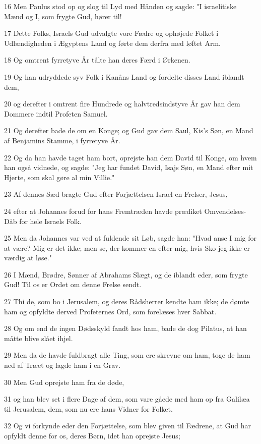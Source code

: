 \par 16 Men Paulus stod op og slog til Lyd med Hånden og sagde: "I israelitiske Mænd og I, som frygte Gud, hører til!
\par 17 Dette Folks, Israels Gud udvalgte vore Fædre og ophøjede Folket i Udlændigheden i Ægyptens Land og førte dem derfra med løftet Arm.
\par 18 Og omtrent fyrretyve År tålte han deres Færd i Ørkenen.
\par 19 Og han udryddede syv Folk i Kanåns Land og fordelte disses Land iblandt dem,
\par 20 og derefter i omtrent fire Hundrede og halvtredsindstyve År gav han dem Dommere indtil Profeten Samuel.
\par 21 Og derefter bade de om en Konge; og Gud gav dem Saul, Kis's Søn, en Mand af Benjamins Stamme, i fyrretyve År.
\par 22 Og da han havde taget ham bort, oprejste han dem David til Konge, om hvem han også vidnede, og sagde: "Jeg har fundet David, Isajs Søn, en Mand efter mit Hjerte, som skal gøre al min Villie."
\par 23 Af dennes Sæd bragte Gud efter Forjættelsen Israel en Frelser, Jesus,
\par 24 efter at Johannes forud for hans Fremtræden havde prædiket Omvendelses-Dåb for hele Israels Folk.
\par 25 Men da Johannes var ved at fuldende sit Løb, sagde han: "Hvad anse I mig for at være? Mig er det ikke; men se, der kommer en efter mig, hvis Sko jeg ikke er værdig at løse."
\par 26 I Mænd, Brødre, Sønner af Abrahams Slægt, og de iblandt eder, som frygte Gud! Til os er Ordet om denne Frelse sendt.
\par 27 Thi de, som bo i Jerusalem, og deres Rådsherrer kendte ham ikke; de dømte ham og opfyldte derved Profeternes Ord, som forelæses hver Sabbat.
\par 28 Og om end de ingen Dødsskyld fandt hos ham, bade de dog Pilatus, at han måtte blive slået ihjel.
\par 29 Men da de havde fuldbragt alle Ting, som ere skrevne om ham, toge de ham ned af Træet og lagde ham i en Grav.
\par 30 Men Gud oprejste ham fra de døde,
\par 31 og han blev set i flere Dage af dem, som vare gåede med ham op fra Galilæa til Jerusalem, dem, som nu ere hans Vidner for Folket.
\par 32 Og vi forkynde eder den Forjættelse, som blev given til Fædrene, at Gud har opfyldt denne for os, deres Børn, idet han oprejste Jesus;
